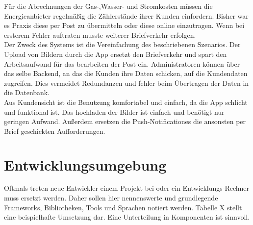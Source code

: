Für die Abrechnungen der Gas-,Wasser- und Stromkosten müssen die Energieanbieter regelmäßig die Zählerstände ihrer
Kunden einfordern. Bisher war es Praxis diese per Post zu übermitteln oder diese online einzutragen. Wenn bei ersterem Fehler auftraten musste weiterer Briefverkehr erfolgen.\\
Der Zweck des Systems ist die Vereinfachung des beschriebenen Szenarios. Der Upload von Bildern durch die App ersetzt den Briefverkehr und spart den Arbeitsaufwand für das bearbeiten der Post ein. Administratoren können über das selbe Backend, an das die Kunden ihre Daten schicken, auf die Kundendaten zugreifen. Dies vermeidet Redundanzen und fehler beim Übertragen der Daten in die Datenbank.\\
Aus Kundensicht ist die Benutzung komfortabel und einfach, da die App schlicht und funktional ist. Das hochladen der Bilder ist einfach und benötigt nur geringen Aufwand. Außerdem ersetzen die Push-Notificationes die ansonsten per Brief geschickten Aufforderungen.



\section{Entwicklungsumgebung}\label{sec:entwicklungsumgebung}
\begin{tcolorbox}
	Oftmals treten neue Entwickler einem Projekt bei oder ein Entwicklungs-Rechner muss ersetzt werden.
	Daher sollen hier nennenswerte und grundlegende Frameworks, Bibliotheken, Tools und Sprachen notiert werden.
	Tabelle X stellt eine beispielhafte Umsetzung dar.
	Eine Unterteilung in Komponenten ist sinnvoll.
\end{tcolorbox}

